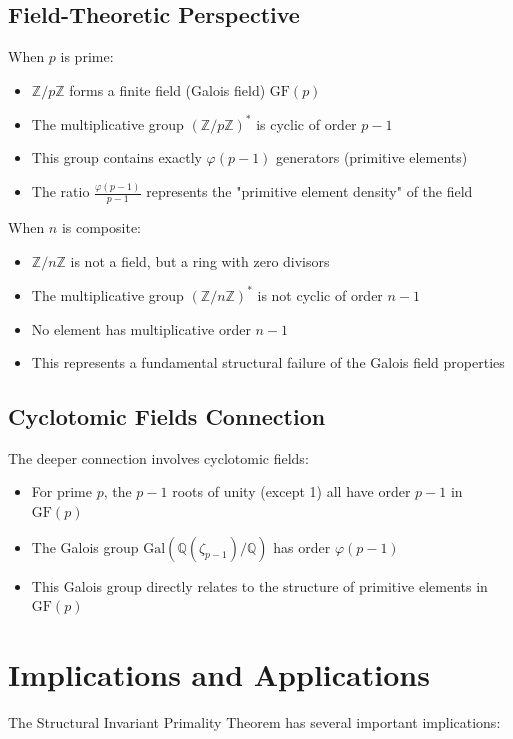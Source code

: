 \documentclass[11pt,a4paper]{article}
\newcommand{\Z}{\mathbb{Z}}
\newcommand{\Q}{\mathbb{Q}}
\newcommand{\GF}{\mathrm{GF}}
\newcommand{\Gal}{\mathrm{Gal}}
\newcommand{\ZnZ}[1]{\Z/{#1}\Z}
\newcommand{\ZnZstar}[1]{(\Z/{#1}\Z)^{*}}
\newcommand{\totient}{\varphi}
\begin{document}
\subsection{Field-Theoretic Perspective}

When $p$ is prime:
\begin{itemize}
    \item $\ZnZ{p}$ forms a finite field (Galois field) $\GF(p)$
    \item The multiplicative group $\ZnZstar{p}$ is cyclic of order $p-1$
    \item This group contains exactly $\totient(p-1)$ generators (primitive elements)
    \item The ratio $\frac{\totient(p-1)}{p-1}$ represents the "primitive element density" of the field
\end{itemize}

When $n$ is composite:
\begin{itemize}
    \item $\ZnZ{n}$ is not a field, but a ring with zero divisors
    \item The multiplicative group $\ZnZstar{n}$ is not cyclic of order $n-1$
    \item No element has multiplicative order $n-1$
    \item This represents a fundamental structural failure of the Galois field properties
\end{itemize}

\subsection{Cyclotomic Fields Connection}

The deeper connection involves cyclotomic fields:
\begin{itemize}
    \item For prime $p$, the $p-1$ roots of unity (except 1) all have order $p-1$ in $\GF(p)$
    \item The Galois group $\Gal(\Q(\zeta_{p-1})/\Q)$ has order $\totient(p-1)$
    \item This Galois group directly relates to the structure of primitive elements in $\GF(p)$
\end{itemize}

\section{Implications and Applications}

The Structural Invariant Primality Theorem has several important implications:
\end{document}
